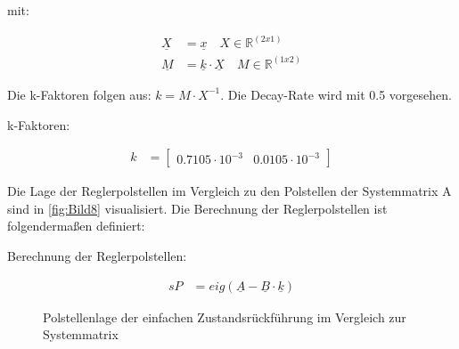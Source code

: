 mit:

\begin{align*}
    \underline{X} &= \underline{x} \quad X\in\mathbb{R}^{(2x1)}\\
    \underline{M} &= \underline{k}\cdot\underline{X} \quad M\in\mathbb{R}^{(1x2)}
\end{align*}

Die k-Faktoren folgen aus: $k = M\cdot X^{-1}$. Die Decay-Rate wird mit 0.5 vorgesehen.\\
\newline

k-Faktoren:

\begin{align}
    k &= 
    \begin{bmatrix}
        0.7105\cdot 10^{-3} & 0.0105\cdot 10^{-3}
    \end{bmatrix}
    \label{eq:Gleichung21}
\end{align}

Die Lage der Reglerpolstellen im Vergleich zu den Polstellen der Systemmatrix A sind in \autoref{fig:Bild8} visualisiert. Die Berechnung der Reglerpolstellen ist folgendermaßen definiert:\\
\newline

Berechnung der Reglerpolstellen:

\begin{align*}
    sP &= eig\left(\underline{A}-\underline{B}\cdot\underline{k}\right)
\end{align*}

\begin{figure}[H]
   \centering
   \caption[Polstellenlage der einfache Zustandsrückführung]{Polstellenlage der einfachen Zustandsrückführung im Vergleich zur Systemmatrix}
   \label{fig:Bild8}
\end{figure}

